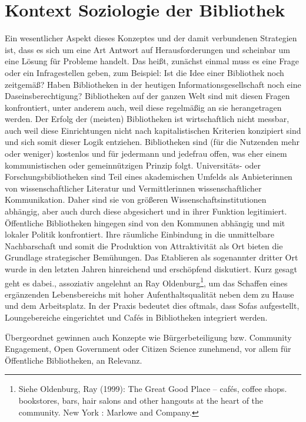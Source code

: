 \documentclass[a4paper,
fontsize=11pt,
oneside,
numbers=noperiodatend,
parskip=half-,
bibliography=totoc,
final
]{scrartcl}
\begin{document}
\hypertarget{kontext-soziologie-der-bibliothek}{%
\section{Kontext Soziologie der
Bibliothek}\label{kontext-soziologie-der-bibliothek}}

Ein wesentlicher Aspekt dieses Konzeptes und der damit verbundenen
Strategien ist, dass es sich um eine Art Antwort auf Herausforderungen
und scheinbar um eine Lösung für Probleme handelt. Das heißt, zunächst
einmal muss es eine Frage oder ein Infragestellen geben, zum Beispiel:
Ist die Idee einer Bibliothek noch zeitgemäß? Haben Bibliotheken in der
heutigen Informationsgesellschaft noch eine Daseinsberechtigung?
Bibliotheken auf der ganzen Welt sind mit diesen Fragen konfrontiert,
unter anderem auch, weil diese regelmäßig an sie herangetragen werden.
Der Erfolg der (meisten) Bibliotheken ist wirtschaftlich nicht messbar,
auch weil diese Einrichtungen nicht nach kapitalistischen Kriterien
konzipiert sind und sich somit dieser Logik entziehen. Bibliotheken sind
(für die Nutzenden mehr oder weniger) kostenlos und für jedermann und
jedefrau offen, was eher einem kommunistischen oder gemeinnützigen
Prinzip folgt. Universitäts- oder Forschungsbibliotheken sind Teil eines
akademischen Umfelds als Anbieterinnen von wissenschaftlicher Literatur
und Vermittlerinnen wissenschaftlicher Kommunikation. Daher sind sie von
größeren Wissenschaftsinstitutionen abhängig, aber auch durch diese
abgesichert und in ihrer Funktion legitimiert. Öffentliche Bibliotheken
hingegen sind von den Kommunen abhängig und mit lokaler Politik
konfrontiert. Ihre räumliche Einbindung in die unmittelbare
Nachbarschaft und somit die Produktion von Attraktivität als Ort bieten
die Grundlage strategischer Bemühungen. Das Etablieren als sogenannter
dritter Ort wurde in den letzten Jahren hinreichend und erschöpfend
diskutiert. Kurz gesagt geht es dabei., assoziativ angelehnt an Ray
Oldenburg\footnote{Siehe Oldenburg, Ray (1999): The Great Good Place --
  cafés, coffee shops. bookstores, bars, hair salons and other hangouts
  at the heart of the community. New York : Marlowe and Company.}, um
das Schaffen eines ergänzenden Lebensbereichs mit hoher
Aufenthaltsqualität neben dem zu Hause und dem Arbeitsplatz. In der
Praxis bedeutet dies oftmals, dass Sofas aufgestellt, Loungebereiche
eingerichtet und Cafés in Bibliotheken integriert werden.

Übergeordnet gewinnen auch Konzepte wie Bürgerbeteiligung bzw. Community
Engagement, Open Government oder Citizen Science zunehmend, vor allem
für Öffentliche Bibliotheken, an Relevanz.
\end{document}
